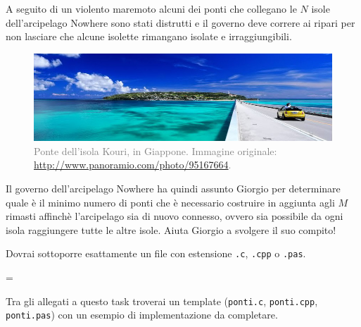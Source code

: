 \usepackage{xcolor}
\usepackage{afterpage}
\usepackage{pifont,mdframed}
\usepackage[bottom]{footmisc}
\usepackage[colorlinks, linkcolor=black, urlcolor=blue]{hyperref}

\makeatletter
\gdef\this@inputfilename{input.txt}
\gdef\this@outputfilename{output.txt}
\makeatother

\newcommand{\inputfile}{\texttt{input.txt}}
\newcommand{\outputfile}{\texttt{output.txt}}

\newenvironment{warning}
  {\par\begin{mdframed}[linewidth=2pt,linecolor=gray]%
    \begin{list}{}{\leftmargin=1cm
                   \labelwidth=\leftmargin}\item[\Large\ding{43}]}
  {\end{list}\end{mdframed}\par}

A seguito di un violento maremoto alcuni dei ponti che collegano le $N$ isole dell'arcipelago Nowhere sono stati distrutti e il governo deve correre ai ripari per non lasciare che alcune isolette rimangano isolate e irraggiungibili.

\begin{figure}[H]
\includegraphics[width = \textwidth]{ponte_cropped.jpg}
\centering\textcolor{gray}{\small{Ponte dell'isola Kouri, in Giappone. Immagine originale: \url{http://www.panoramio.com/photo/95167664}.}}
\end{figure}

Il governo dell'arcipelago Nowhere ha quindi assunto Giorgio per determinare quale è il minimo numero di ponti che è necessario costruire in aggiunta agli $M$ rimasti affinchè l'arcipelago sia di nuovo connesso, ovvero sia possibile da ogni isola raggiungere tutte le altre isole. Aiuta Giorgio a svolgere il suo compito!

\Implementation
Dovrai sottoporre esattamente un file con estensione \texttt{.c}, \texttt{.cpp} o \texttt{.pas}.

\begin{warning}
Tra gli allegati a questo task troverai un template (\texttt{ponti.c}, \texttt{ponti.cpp}, \texttt{ponti.pas}) con un esempio di implementazione da completare.
\end{warning}

